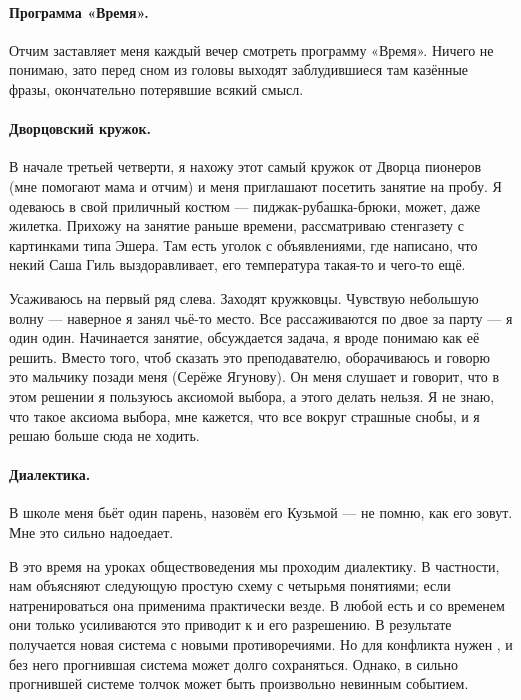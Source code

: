 \documentclass{book}
\begin{document}
\paragraph{Программа «Время».}
Отчим заставляет меня каждый вечер смотреть программу «Время».
Ничего не понимаю, зато перед сном из головы выходят 
заблудившиеся там казённые фразы, окончательно потерявшие всякий смысл.

\paragraph{Дворцовский кружок.}
В начале третьей четверти,
я нахожу этот самый кружок от Дворца пионеров (мне помогают мама и отчим) и меня приглашают посетить занятие на пробу.
Я одеваюсь в свой приличный костюм --- пиджак-рубашка-брюки, может, даже жилетка.
Прихожу на занятие раньше времени, рассматриваю стенгазету с картинками типа Эшера.
Там есть уголок с объявлениями, где написано, что некий Саша Гиль выздоравливает, его температура такая-то и чего-то ещё.

Усаживаюсь на первый ряд слева.
Заходят кружковцы.
Чувствую небольшую волну --- наверное я занял чьё-то место.
Все рассаживаются по двое за парту --- я один один.
Начинается занятие, обсуждается задача, я вроде понимаю как её решить.
Вместо того, чтоб сказать это преподавателю, оборачиваюсь и говорю это мальчику позади меня 
(Серёже Ягунову).
Он меня слушает и говорит, что в этом решении я пользуюсь аксиомой выбора, а этого делать нельзя.
Я не знаю, что такое аксиома выбора, мне кажется, что все вокруг страшные снобы, и я решаю больше сюда не ходить.

\paragraph{Диалектика.}
В школе меня бьёт один парень, назовём его Кузьмой --- не помню, как его зовут.
Мне это сильно надоедает.

В это время на уроках обществоведения мы проходим диалектику.
В частности, нам объясняют следующую простую схему с четырьмя понятиями;
если натренироваться она применима практически везде.
В любой  есть  и со временем они только усиливаются это приводит к  и его разрешению.
В результате получается новая система с новыми противоречиями.
Но для конфликта нужен , 
и без него прогнившая система может долго сохраняться.
Однако, в сильно прогнившей системе толчок может быть произвольно невинным событием.
\end{document}
